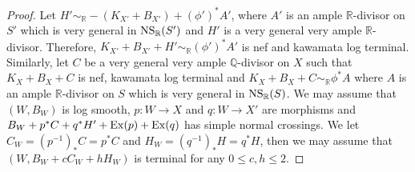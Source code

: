 \documentclass[12pt]{amsart}
\theoremstyle{plain}
\newcommand\Q{{\mathbb{Q}}}
\newcommand\R{{\mathbb{R}}}
\begin{document}
\begin{proof} Let $H'\sim_\R-(K_{X'}+B_{X'})+(\phi ')^*A'$, where $A'$ is an 
ample $\R$-divisor on $S'$ which is very general in ${\rm NS}_\R(S')$ 
and $H'$ is a very general very ample $\R$-divisor. 
Therefore, $K_{X'}+B_{X'}+H'\sim_\R (\phi ')^*A'$ is nef and kawamata log terminal.
Similarly, let $C$ be a very general very ample $\Q$-divisor on $X$
such that $K_X+B_X+C$ is nef, kawamata log terminal and
$K_X+B_X+C \sim _{\R}\phi ^* A$ where $A$ is an 
ample $\R$-divisor on $S$ which is very general in ${\rm NS}_\R(S)$.
We may assume that $(W,B_W)$ is log smooth, $p:W\to X$ and $q:W\to X'$ are morphisms and $B_W+p^*C+q^*H'+{\rm Ex}(p)+{\rm Ex}(q)$ has simple normal crossings.
We let $C_W=(p^{-1})_*C=p^*C$ and $H_W=(q^{-1})_*H=q^*H$, then we may assume that 
$(W,B_W+cC_W+hH_W)$ is terminal for any $0\leq c,h\leq 2$.



\end{proof}
\end{document}
